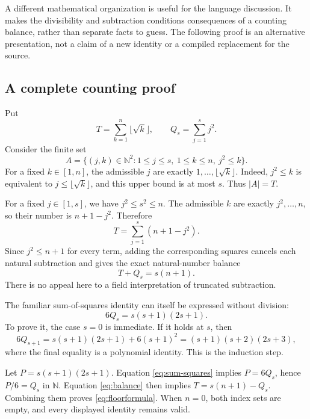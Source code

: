 \documentclass[11pt,a4paper]{article}
\newcommand{\N}{\mathbb N}
\theoremstyle{definition}
\theoremstyle{remark}
\numberwithin{equation}{section}
\begin{document}
A different mathematical organization is useful for the language discussion. It makes the divisibility and subtraction conditions consequences of a counting balance, rather than separate facts to guess. The following proof is an alternative presentation, not a claim of a new identity or a compiled replacement for the source.

\subsection{A complete counting proof}
Put
\[
 T=\sum_{k=1}^{n}\lfloor\sqrt k\rfloor,
 \qquad Q_s=\sum_{j=1}^{s}j^2.
\]
Consider the finite set
\[
 A=\{(j,k)\in\N^2:1\le j\le s,\ 1\le k\le n,\ j^2\le k\}.
\]
For a fixed $k\in[1,n]$, the admissible $j$ are exactly $1,\ldots,\lfloor\sqrt k\rfloor$. Indeed, $j^2\le k$ is equivalent to $j\le\lfloor\sqrt k\rfloor$, and this upper bound is at most $s$. Thus $|A|=T$.

For a fixed $j\in[1,s]$, we have $j^2\le s^2\le n$. The admissible $k$ are exactly $j^2,\ldots,n$, so their number is $n+1-j^2$. Therefore
\[
 T=\sum_{j=1}^{s}(n+1-j^2).
\]
Since $j^2\le n+1$ for every term, adding the corresponding squares cancels each natural subtraction and gives the exact natural-number balance
\begin{equation}\label{eq:balance}
 T+Q_s=s(n+1).
\end{equation}
There is no appeal here to a field interpretation of truncated subtraction.

The familiar sum-of-squares identity can itself be expressed without division:
\begin{equation}\label{eq:sum-squares}
 6Q_s=s(s+1)(2s+1).
\end{equation}
To prove it, the case $s=0$ is immediate. If it holds at $s$, then
\[
 6Q_{s+1}=s(s+1)(2s+1)+6(s+1)^2
          =(s+1)(s+2)(2s+3),
\]
where the final equality is a polynomial identity. This is the induction step.

Let $P=s(s+1)(2s+1)$. Equation \eqref{eq:sum-squares} implies $P=6Q_s$, hence $P/6=Q_s$ in $\N$. Equation \eqref{eq:balance} then implies $T=s(n+1)-Q_s$. Combining them proves \cref{eq:floorformula}. When $n=0$, both index sets are empty, and every displayed identity remains valid.
\end{document}
